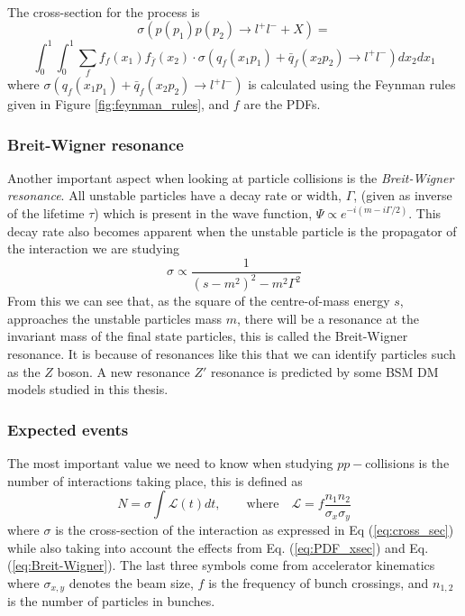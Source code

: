 \documentclass[12pt, a4paper]{book}
\begin{document}
\\The cross-section for the process is 
$$
\sigma\left(p(p_1) p(p_2)\rightarrow l^+l^- +X\right)=
$$
\begin{equation}\label{eq:PDF_xsec}
    \int_{0}^{1}\int_{0}^{1}\sum_{f}f_f(x_1)f_{\bar{f}}(x_2)\cdot\sigma\left(q_f(x_1p_1)+\bar{q}_f(x_2p_2)\rightarrow l^+l^- \right) dx_2dx_1
\end{equation}
where $\sigma\left(q_f(x_1p_1)+\bar{q}_f(x_2p_2)\rightarrow l^+l^- \right)$ is calculated using the Feynman rules given in Figure \ref{fig:feynman_rules}, and $f$ are the PDFs. %

\subsubsection{Breit-Wigner resonance}
Another important aspect when looking at particle collisions is the \textit{Breit-Wigner resonance}. All unstable particles have a decay rate or width, $\Gamma$, (given as inverse of the lifetime $\tau$) which is present in the wave function, 
$\Psi \propto e^{-i(m-i\Gamma/2)}$. This decay rate also becomes apparent when the unstable particle is the propagator of the interaction we are studying 
\begin{equation}\label{eq:Breit-Wigner}
    \sigma \propto\frac{1}{(s-m^2)^2-m^2\Gamma^2}
\end{equation}
From this we can see that, as the square of the centre-of-mass energy $s$, approaches the unstable particles mass $m$, there will be a resonance at the invariant mass of the final state particles, this is called the Breit-Wigner resonance. 
It is because of resonances like this that we can identify particles such as the $Z$ boson. A new resonance $Z'$ resonance is predicted by some BSM DM models studied in this thesis.\\


\subsubsection{Expected events}
The most important value we need to know when studying $pp-$collisions is the number of interactions taking place, this is defined as
\begin{equation}\label{eq:expected_events}
    N=\sigma\int\mathcal{L}(t)dt, \qquad\text{where}\quad \mathcal{L}=f\frac{n_1n_2}{\sigma_x\sigma_y}
\end{equation}
where $\sigma$ is the cross-section of the interaction as expressed in Eq (\ref{eq:cross_sec}) while also taking into account the effects from Eq. (\ref{eq:PDF_xsec}) and Eq. (\ref{eq:Breit-Wigner}).
The last three symbols come from accelerator kinematics where $\sigma_{x,y}$ denotes the beam size, $f$ is the frequency of bunch crossings, and $n_{1,2}$ is the number of particles in bunches.
\end{document}
